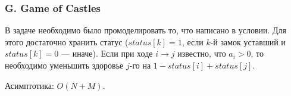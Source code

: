 \subsubsection*{G. Game of Castles} 


В задаче необходимо было промоделировать  то, что написано в условии. Для этого достаточно хранить статус ($status[k] = 1$, если $k$-й замок уставший и $status[k] = 0$ --- иначе). Если при ходе $i \rightarrow j$ известно, что $a_i > 0$, то необходимо уменьшить здоровье $j$-го на $1 - status[i] + status[j]$.

Асимптотика: $O(N + M)$.